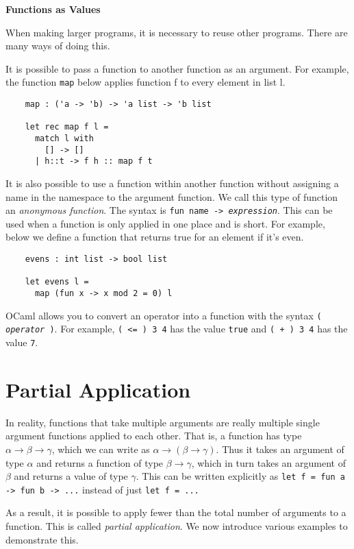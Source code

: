 \documentclass[12pt]{article}
\begin{document}
\begin{center}\LARGE\bf
    Functions as Values
\end{center}

When making larger programs, it is necessary to reuse other programs. There are many ways of doing this.

It is possible to pass a function to another function as an argument. For example, the function \texttt{map}
below applies function f to every element in list l.
\begin{lstlisting}
    map : ('a -> 'b) -> 'a list -> 'b list

    let rec map f l =
      match l with
        [] -> []
      | h::t -> f h :: map f t
\end{lstlisting}

It is also possible to use a function within another function without assigning a name in the namespace to the argument function.
We call this type of function an \textit{anonymous function}. The syntax is
\texttt{fun name -> \textit{expression}}. This can be used when a function is only applied in one place and is
short. For example, below we define a function that returns true for an element if it's even.
\begin{lstlisting}
    evens : int list -> bool list

    let evens l =
      map (fun x -> x mod 2 = 0) l
\end{lstlisting}

OCaml allows you to convert an operator into a function with the syntax \texttt{( \textit{operator} )}. For example,
\texttt{( <= ) 3 4} has the value \texttt{true} and \texttt{( + ) 3 4} has the value \texttt{7}.

\section{Partial Application}
In reality, functions that take multiple arguments are really multiple single argument functions applied to
each other. That is, a function  has type $\alpha \rightarrow \beta \rightarrow \gamma$, which we can write as
$\alpha \rightarrow (\beta \rightarrow \gamma)$. Thus it takes an argument of type $\alpha$ and returns a function of type
$\beta \rightarrow \gamma$, which in turn takes an argument of $\beta$ and returns a value of type $\gamma$. This can be written
explicitly as \texttt{let f = fun a -> fun b -> ...} instead of just \texttt{let f = ...}

As a result, it is possible to apply fewer than the total number of arguments to a function. This is called \textit{partial
application}. We now introduce various examples to demonstrate this.
\end{document}
